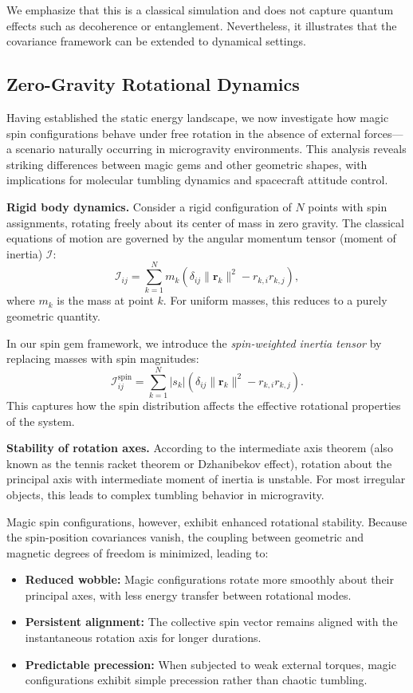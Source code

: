 We emphasize that this is a classical simulation and does not capture quantum effects such as decoherence or entanglement. Nevertheless, it illustrates that the covariance framework can be extended to dynamical settings.

\subsection{Zero-Gravity Rotational Dynamics}

Having established the static energy landscape, we now investigate how magic spin configurations behave under free rotation in the absence of external forces---a scenario naturally occurring in microgravity environments. This analysis reveals striking differences between magic gems and other geometric shapes, with implications for molecular tumbling dynamics and spacecraft attitude control.

\textbf{Rigid body dynamics.} Consider a rigid configuration of $N$ points with spin assignments, rotating freely about its center of mass in zero gravity. The classical equations of motion are governed by the angular momentum tensor (moment of inertia) $\mathcal{I}$:
\[
\mathcal{I}_{ij} = \sum_{k=1}^N m_k (\delta_{ij} \|\mathbf{r}_k\|^2 - r_{k,i} r_{k,j}),
\]
where $m_k$ is the mass at point $k$. For uniform masses, this reduces to a purely geometric quantity.

In our spin gem framework, we introduce the \emph{spin-weighted inertia tensor} by replacing masses with spin magnitudes:
\[
\mathcal{I}^{\text{spin}}_{ij} = \sum_{k=1}^N |s_k| (\delta_{ij} \|\mathbf{r}_k\|^2 - r_{k,i} r_{k,j}).
\]
This captures how the spin distribution affects the effective rotational properties of the system.

\textbf{Stability of rotation axes.} According to the intermediate axis theorem (also known as the tennis racket theorem or Dzhanibekov effect), rotation about the principal axis with intermediate moment of inertia is unstable. For most irregular objects, this leads to complex tumbling behavior in microgravity.

Magic spin configurations, however, exhibit enhanced rotational stability. Because the spin-position covariances vanish, the coupling between geometric and magnetic degrees of freedom is minimized, leading to:

\begin{itemize}
\item \textbf{Reduced wobble:} Magic configurations rotate more smoothly about their principal axes, with less energy transfer between rotational modes.
\item \textbf{Persistent alignment:} The collective spin vector remains aligned with the instantaneous rotation axis for longer durations.
\item \textbf{Predictable precession:} When subjected to weak external torques, magic configurations exhibit simple precession rather than chaotic tumbling.
\end{itemize}

